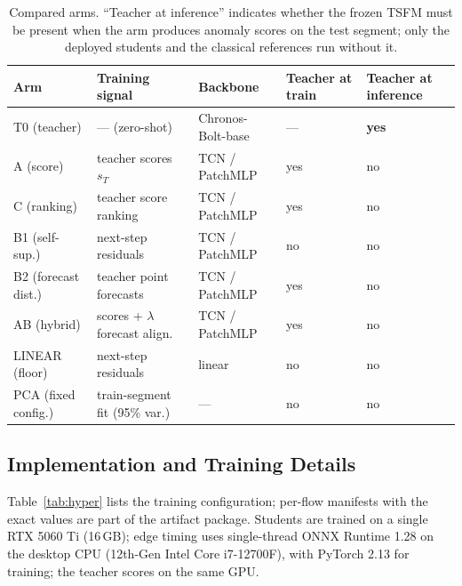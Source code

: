 \begin{table}[t]
\centering
\caption{Compared arms. ``Teacher at inference'' indicates whether the
frozen TSFM must be present when the arm produces anomaly scores on the
test segment; only the deployed students and the classical references
run without it.}
\label{tab:arms}
\scriptsize
\begin{tabular}{p{2.2cm}p{3.1cm}p{2.0cm}p{1.5cm}p{1.7cm}}
\toprule
Arm & Training signal & Backbone & Teacher at train & Teacher at inference \\
\midrule
T0 (teacher) & --- (zero-shot) & Chronos-Bolt-base & --- & \textbf{yes} \\
A (score) & teacher scores $s_T$ & TCN / PatchMLP & yes & no \\
C (ranking) & teacher score ranking & TCN / PatchMLP & yes & no \\
B1 (self-sup.) & next-step residuals & TCN / PatchMLP & no & no \\
B2 (forecast dist.) & teacher point forecasts & TCN / PatchMLP & yes & no \\
AB (hybrid) & scores + $\lambda$ forecast align. & TCN / PatchMLP & yes & no \\
LINEAR (floor) & next-step residuals & linear & no & no \\
PCA (fixed config.) & train-segment fit (95\% var.) & --- & no & no \\
\bottomrule
\end{tabular}
\end{table}

\subsection{Implementation and Training Details}\label{sec:setup-impl}
Table~\ref{tab:hyper} lists the training configuration; per-flow manifests
with the exact values are part of the artifact package. Students are
trained on a single RTX 5060 Ti (16\,GB); edge timing uses single-thread
ONNX Runtime 1.28 on the desktop CPU (12th-Gen Intel Core i7-12700F),
with PyTorch 2.13 for training; the teacher scores on the same GPU.

